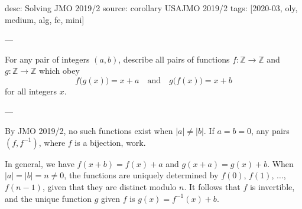 desc: Solving JMO 2019/2
source: corollary USAJMO 2019/2
tags: [2020-03, oly, medium, alg, fe, mini]

---

For any pair of integers $(a,b)$, describe all pairs of functions $f:\mathbb Z\to\mathbb Z$ and $g:\mathbb Z\to\mathbb Z$ which obey \[f\big(g(x)\big)=x+a\quad\text{and}\quad g\big(f(x)\big)=x+b\]
for all integers $x$.

---

By JMO 2019/2, no such functions exist when $|a|\ne|b|$. If $a=b=0$, any pairs $(f,f^{-1})$, where $f$ is a bijection, work.

In general, we have $f(x+b)=f(x)+a$ and $g(x+a)=g(x)+b$. When $|a|=|b|=n\ne0$, the functions are uniquely determined by $f(0)$, $f(1)$, $\ldots$, $f(n-1)$, given that they are distinct modulo $n$. It follows that $f$ is invertible, and the unique function $g$ given $f$ is $g(x)=f^{-1}(x)+b$.

